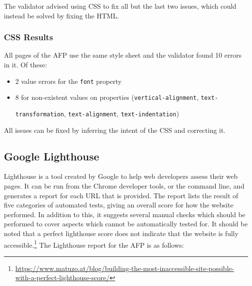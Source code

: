 \documentclass[bsc,frontabs,oneside,singlespacing,parskip,deptreport,logo]{infthesis}
\begin{document}
The validator advised using CSS to fix all but the last two issues, which could instead be solved by fixing the HTML.

\subsubsection{CSS Results} \label{W3CCSS}

All pages of the AFP use the same style sheet and the validator found 10 errors in it. Of these:

\begin{itemize}
    \item 2 value errors for the \verb|font| property
    \item 8 for non-existent values on properties (\verb|vertical-alignment|, \verb|text-|
    
    \verb|transformation|, \verb|text-alignment|, \verb|text-indentation|)
\end{itemize}

All issues can be fixed by inferring the intent of the CSS and correcting it.

\subsection{Google Lighthouse}

Lighthouse \cite{lighthouse} is a tool created by Google to help web developers assess their web pages. It can be run from the Chrome developer tools, or the command line, and generates a report for each URL that is provided. The report lists the result of five categories of automated tests, giving an overall score for how the website performed. In addition to this, it suggests several manual checks which should be performed to cover aspects which cannot be automatically tested for. It should be noted that a perfect lighthouse score does not indicate that the website is fully accessible.\footnote{\url{https://www.matuzo.at/blog/building-the-most-inaccessible-site-possible-with-a-perfect-lighthouse-score/}} 
The Lighthouse report for the AFP is as follows:
\end{document}
